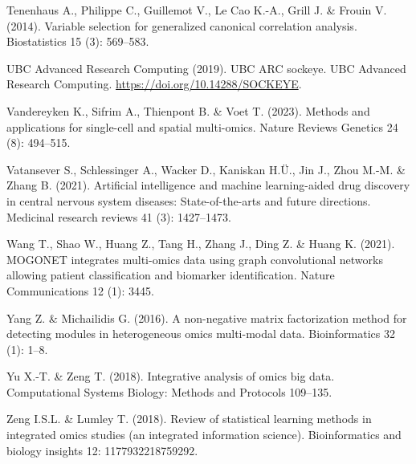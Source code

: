 \documentclass[
]{article}
\newlength{\cslhangindent}
\newlength{\cslentryspacingunit} %
\newenvironment{CSLReferences}[2] %
 {%
  \setlength{\parindent}{0pt}
  \ifodd #1
  \let\oldpar\par
  \def\par{\hangindent=\cslhangindent\oldpar}
  \fi
  \setlength{\parskip}{#2\cslentryspacingunit}
 }%
 {}
\begin{document}
\begin{CSLReferences}{1}{0}
\leavevmode{}%
Tenenhaus A., Philippe C., Guillemot V., Le Cao K.-A., Grill J. \& Frouin V. (2014). Variable selection for generalized canonical correlation analysis. Biostatistics 15 (3): 569--583.

\leavevmode{}%
UBC Advanced Research Computing (2019). UBC ARC sockeye. UBC Advanced Research Computing. \url{https://doi.org/10.14288/SOCKEYE}.

\leavevmode{}%
Vandereyken K., Sifrim A., Thienpont B. \& Voet T. (2023). Methods and applications for single-cell and spatial multi-omics. Nature Reviews Genetics 24 (8): 494--515.

\leavevmode{}%
Vatansever S., Schlessinger A., Wacker D., Kaniskan H.Ü., Jin J., Zhou M.-M. \& Zhang B. (2021). Artificial intelligence and machine learning-aided drug discovery in central nervous system diseases: State-of-the-arts and future directions. Medicinal research reviews 41 (3): 1427--1473.

\leavevmode{}%
Wang T., Shao W., Huang Z., Tang H., Zhang J., Ding Z. \& Huang K. (2021). MOGONET integrates multi-omics data using graph convolutional networks allowing patient classification and biomarker identification. Nature Communications 12 (1): 3445.

\leavevmode{}%
Yang Z. \& Michailidis G. (2016). A non-negative matrix factorization method for detecting modules in heterogeneous omics multi-modal data. Bioinformatics 32 (1): 1--8.

\leavevmode{}%
Yu X.-T. \& Zeng T. (2018). Integrative analysis of omics big data. Computational Systems Biology: Methods and Protocols 109--135.

\leavevmode{}%
Zeng I.S.L. \& Lumley T. (2018). Review of statistical learning methods in integrated omics studies (an integrated information science). Bioinformatics and biology insights 12: 1177932218759292.

\end{CSLReferences}

\hypertarget{appendix-appendix}{%
\appendix}
\end{document}
